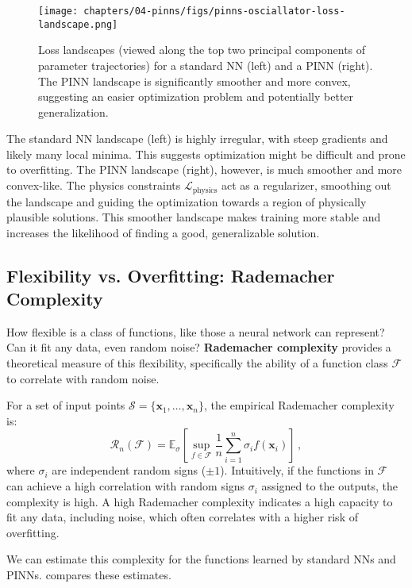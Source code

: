 \begin{figure}[htbp]
    \centering
    \texttt{[image: chapters/04-pinns/figs/pinns-osciallator-loss-landscape.png]}
    \caption{Loss landscapes (viewed along the top two principal components of parameter trajectories) for a standard NN (left) and a PINN (right). The PINN landscape is significantly smoother and more convex, suggesting an easier optimization problem and potentially better generalization.}
    \label{fig:loss_landscape}
\end{figure}

The standard NN landscape (left) is highly irregular, with steep gradients and likely many local minima. This suggests optimization might be difficult and prone to overfitting. The PINN landscape (right), however, is much smoother and more convex-like. The physics constraints $\mathcal{L}_{\text{physics}}$ act as a regularizer, smoothing out the landscape and guiding the optimization towards a region of physically plausible solutions. This smoother landscape makes training more stable and increases the likelihood of finding a good, generalizable solution.

\subsection{Flexibility vs. Overfitting: Rademacher Complexity}

How flexible is a class of functions, like those a neural network can represent? Can it fit any data, even random noise? \textbf{Rademacher complexity} provides a theoretical measure of this flexibility, specifically the ability of a function class $\mathcal{F}$ to correlate with random noise.

For a set of input points $\mathcal{S} = \{ \mathbf{x}_1, \ldots, \mathbf{x}_n \}$, the empirical Rademacher complexity is:
%
\[
\mathcal{R}_n(\mathcal{F}) = \mathbb{E}_{\sigma} \left[ \sup_{f \in \mathcal{F}} \frac{1}{n} \sum_{i=1}^n \sigma_i f(\mathbf{x}_i) \right]\,,
\]
%
where $\sigma_i$ are independent random signs ($\pm 1$). Intuitively, if the functions in $\mathcal{F}$ can achieve a high correlation with random signs $\sigma_i$ assigned to the outputs, the complexity is high. A high Rademacher complexity indicates a high capacity to fit any data, including noise, which often correlates with a higher risk of overfitting.

We can estimate this complexity for the functions learned by standard NNs and PINNs.  compares these estimates.

